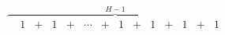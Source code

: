 \documentclass{article}
\begin{document}
$$
    \overbrace{
        \begin{matrix}
             & 1 & + & 1 & + & \cdots & + & 1 & + & 1 & + & 1 & + & 1 \\
        \end{matrix}
    }^{H-1}
$$
\end{document}
